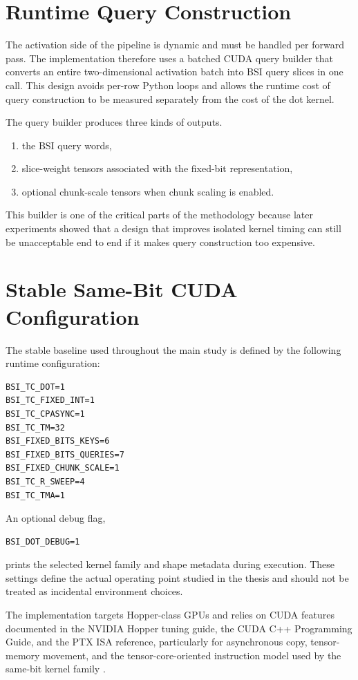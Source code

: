 \section{Runtime Query Construction}
The activation side of the pipeline is dynamic and must be handled per forward pass. The implementation therefore uses a batched CUDA query builder that converts an entire two-dimensional activation batch into BSI query slices in one call. This design avoids per-row Python loops and allows the runtime cost of query construction to be measured separately from the cost of the dot kernel.

The query builder produces three kinds of outputs.

\begin{enumerate}[leftmargin=2em]
\item the BSI query words,
\item slice-weight tensors associated with the fixed-bit representation,
\item optional chunk-scale tensors when chunk scaling is enabled.
\end{enumerate}

This builder is one of the critical parts of the methodology because later experiments showed that a design that improves isolated kernel timing can still be unacceptable end to end if it makes query construction too expensive.

\section{Stable Same-Bit CUDA Configuration}
The stable baseline used throughout the main study is defined by the following runtime configuration:

\begin{verbatim}
BSI_TC_DOT=1
BSI_TC_FIXED_INT=1
BSI_TC_CPASYNC=1
BSI_TC_TM=32
BSI_FIXED_BITS_KEYS=6
BSI_FIXED_BITS_QUERIES=7
BSI_FIXED_CHUNK_SCALE=1
BSI_TC_R_SWEEP=4
BSI_TC_TMA=1
\end{verbatim}

An optional debug flag,

\begin{verbatim}
BSI_DOT_DEBUG=1
\end{verbatim}

prints the selected kernel family and shape metadata during execution. These settings define the actual operating point studied in the thesis and should not be treated as incidental environment choices.

The implementation targets Hopper-class GPUs and relies on CUDA features documented in the NVIDIA Hopper tuning guide, the CUDA C++ Programming Guide, and the PTX ISA reference, particularly for asynchronous copy, tensor-memory movement, and the tensor-core-oriented instruction model used by the same-bit kernel family \cite{nvidia_hopper_tuning,nvidia_cuda_guide,nvidia_ptx_isa}.

